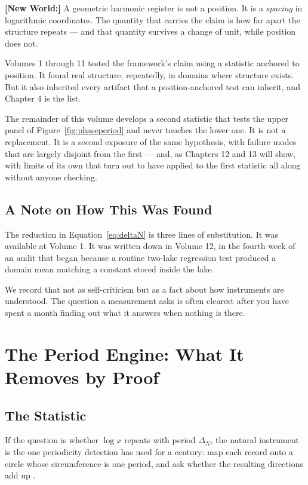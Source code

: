 \documentclass[11pt, letterpaper, openany]{book}
\newcommand{\newworld}[1]{\noindent\textbf{\color{kishblue}[New World:]} #1\medskip}
\begin{document}
\newworld{A geometric harmonic register is not a position. It is a \emph{spacing} in
logarithmic coordinates. The quantity that carries the claim is how far apart the structure
repeats --- and that quantity survives a change of unit, while position does not.

\medskip
Volumes 1 through 11 tested the framework's claim using a statistic anchored to position. It
found real structure, repeatedly, in domains where structure exists. But it also inherited
every artifact that a position-anchored test can inherit, and Chapter 4 is the list.}

The remainder of this volume develops a second statistic that tests the upper panel of
Figure~\ref{fig:phaseperiod} and never touches the lower one. It is not a replacement. It is a second exposure of
the same hypothesis, with failure modes that are largely disjoint from the first --- and, as
Chapters 12 and 13 will show, with limits of its own that turn out to have applied to the
first statistic all along without anyone checking.

\section{A Note on How This Was Found}

The reduction in Equation~\ref{eq:deltaN} is three lines of substitution. It was available at
Volume 1. It was written down in Volume 12, in the fourth week of an audit that began because a
routine two-lake regression test produced a domain mean matching a constant stored inside the
lake.

We record that not as self-criticism but as a fact about how instruments are understood. The
question a measurement asks is often clearest after you have spent a month finding out what it
answers when nothing is there.

\chapter{The Period Engine: What It Removes by Proof}

\section{The Statistic}

If the question is whether $\log x$ repeats with period $\Delta_N$, the natural instrument is
the one periodicity detection has used for a century: map each record onto a circle whose
circumference is one period, and ask whether the resulting directions add up
\cite{rayleigh1880, mardia2000, fisher1993}.
\end{document}
